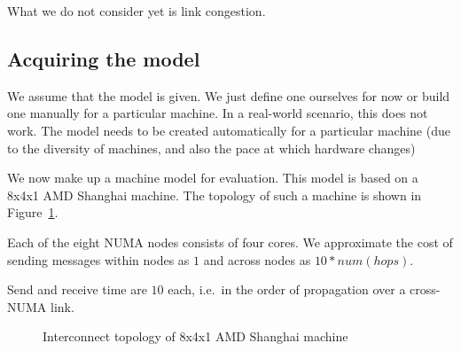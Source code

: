 \documentclass{article}
\begin{document}
What we do not consider yet is link congestion. 

\subsection{Acquiring the model}

We assume that the model is given. We just define one ourselves for
now or build one manually for a particular machine. In a real-world
scenario, this does not work. The model needs to be created
automatically for a particular machine (due to the diversity of
machines, and also the pace at which hardware changes)

We now make up a machine model for evaluation. This model is based on
a 8x4x1 AMD Shanghai machine. The topology of such a machine is shown
in Figure~\ref{fig:gruyere}.

Each of the eight NUMA nodes consists of four cores. We approximate the
cost of sending messages within nodes as $1$ and across nodes as
$10*num(hops)$.

Send and receive time are $10$ each, i.e.\ in the order of propagation
over a cross-NUMA link.

\begin{figure}[htb]
  \centering
  \caption{Interconnect topology of 8x4x1 AMD Shanghai machine}
  \label{fig:gruyere}
\end{figure}
\end{document}
